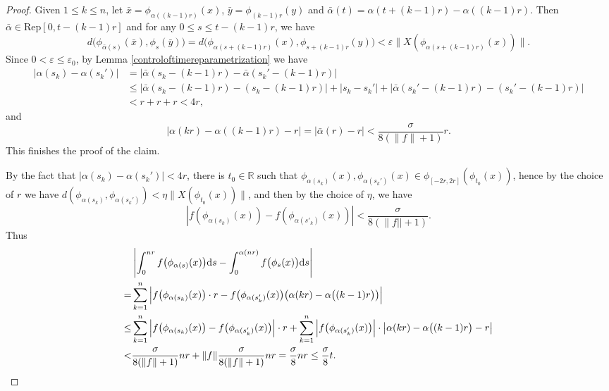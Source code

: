 \documentclass[10pt]{article}
\newtheorem*{Theorem A}{Theorem A}
\begin{document}
\noindent
\begin{proof} Given $ 1 \leq k \leq n$, let $\bar{x} = \phi_{\alpha((k-1)r)}(x)$, $\bar{y} = \phi_{(k-1)r}(y)$ and $\bar{\alpha}(t) = \alpha(t + (k-1)r) - \alpha((k-1)r)$. Then $\bar{\alpha} \in \text{Rep}[0, t - (k-1)r]$  and for any $0 \leq s \leq t - (k-1)r$, we have
\[
d\bigl( \phi_{\bar{\alpha}(s)}(\bar{x}), \phi_s(\bar{y}) \bigr) = d\bigl( \phi_{\alpha(s + (k-1)r)}(x), \phi_{s + (k-1)r}(y) \bigr) < \varepsilon \| X(\phi_{\alpha(s + (k-1)r)}(x)) \|.
\]
\noindent
Since  $0 < \varepsilon \leq \varepsilon_0$, by Lemma \ref{controloftimereparametrization} we have
\begin{align*}
|\alpha(s_k) - \alpha(s_k')| &= |\bar{\alpha}(s_k - (k-1)r) - \bar{\alpha}(s_k' - (k-1)r)| \\
&\leq \left| \bar{\alpha}(s_k - (k-1)r) - (s_k - (k-1)r) \right| + |s_k - s_k'| + \left| \bar{\alpha}(s_k' - (k-1)r) - (s_k' - (k-1)r) \right| \\
&< r + r + r < 4r,
\end{align*}
and
\[
\left| \alpha(kr) - \alpha((k-1)r) - r \right| = \left| \bar{\alpha}(r) - r \right| < \frac{\sigma}{8(\| f \| + 1)} r.
\]
This finishes the proof of the claim.
\hfill \qedsymbol

\bigskip

By the fact that $|\alpha(s_k)-\alpha(s_k')|< 4r$, there is $t_0\in\mathbb{R}$ such that $\phi_{\alpha(s_k)}(x), \phi_{\alpha(s_k')}(x)\in \phi_{[-2r, 2r]}(\phi_{t_0}(x))$, hence by the choice of $r$ we have $d(\phi_{\alpha(s_k)},\phi_{\alpha(s_k')})<\eta\|X(\phi_{t_0}(x))\|$, and then by the choice of $\eta$, we have
\[
\left|  f(\phi_{\alpha(s_k)}(x)) - f(\phi_{\alpha(s'_{k})}(x))  \right| < \frac{\sigma}{8(\|f||+1)}.
\]
Thus
\begin{align*}
&\left| \int_0^{nr} f\bigl( \phi_{\alpha(s)}(x) \bigr) {\rm d}s - \int_0^{\alpha(nr)} f\bigl( \phi_s(x) \bigr) {\rm d}s \right| \\
= \displaystyle &\sum_{k=1}^n \left| f\bigl( \phi_{\alpha(s_k)}(x) \bigr) \cdot r -f\bigl( \phi_{\alpha(s_k')}(x) \bigr) \bigl( \alpha(kr) - \alpha\bigl((k - 1)r\bigr) \bigr) \right| \\
\leq &\displaystyle\sum_{k=1}^n \left| f\bigl( \phi_{\alpha(s_k)}(x) \bigr) - f\bigl( \phi_{\alpha(s_k')}(x) \bigr) \right| \cdot r + \displaystyle\sum_{k=1}^n \left| f\bigl( \phi_{\alpha(s_k')}(x) \bigr) \right| \cdot \left| \alpha(kr) - \alpha\bigl((k - 1)r\bigr) - r \right| \\
<& \frac{\sigma}{8(\| f \| + 1)}  nr + \| f\|  \frac{\sigma}{8(\| f \| + 1)}  nr=\frac{\sigma}{8} nr \leq \frac{\sigma}{8} t.
\end{align*}


\end{proof}
\end{document}
